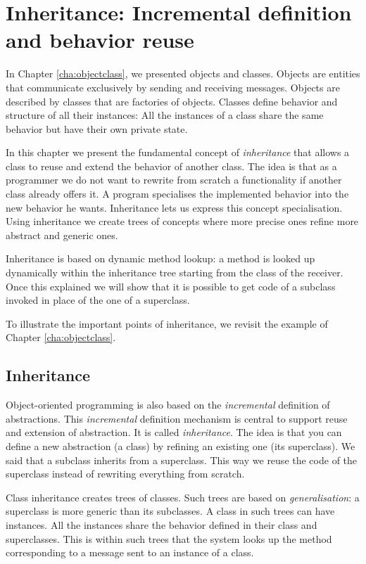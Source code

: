 \documentclass[10pt,twoside,english]{_support/latex/sbabook/sbabook}
\begin{document}
\frontmatter
\pagestyle{plain}

\tableofcontents*
\clearpage\listoffigures

\mainmatter

\chapter{Inheritance: Incremental definition and behavior reuse}\label{cha:inheritance}
In Chapter \ref{cha:objectclass}, we presented objects and classes. Objects are entities that communicate exclusively by sending and receiving messages. Objects are described by classes that are factories of objects. Classes define behavior and structure of all their instances: All the instances of a class share the same behavior but have their own private state. 

In this chapter we present the fundamental concept of  \textit{inheritance} that allows a class to reuse and extend the behavior of another class. The idea is that as a programmer we do not want to rewrite from scratch a functionality if another class already offers it. A program specialises the implemented behavior into the new behavior he wants. Inheritance lets us express this concept specialisation.  Using inheritance we create trees of concepts where more precise ones refine more abstract and generic ones. 

Inheritance is based on dynamic method lookup: a method is looked up dynamically within the inheritance tree starting from the class of the receiver. Once this explained we will show that it is possible to get code of a subclass invoked in place of the one of a superclass. 

To illustrate the important points of inheritance, we revisit the example of Chapter \ref{cha:objectclass}. 
\section{Inheritance}
Object-oriented programming is also based on the \textit{incremental} definition of abstractions. This \textit{incremental} definition mechanism is central to support reuse and extension of abstraction. It is called \textit{inheritance}. The idea is that you can define a new abstraction (a class) by refining an existing one (its superclass). We said that a subclass inherits from a superclass. This way we reuse the code of the superclass instead of rewriting everything from scratch.

Class inheritance creates trees of classes. Such trees are based on \textit{generalisation}: a superclass is more generic than its subclasses. A class in such trees can have instances. All the instances share the behavior defined in their class and superclasses.
This is within such trees that the system looks up the method corresponding to a message sent to an instance of a class.
\end{document}
